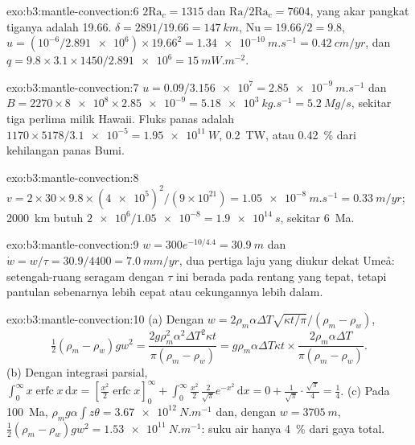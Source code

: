 \begin{solution}{exo:b3:mantle-convection:6}
$2\mathrm{Ra}_c = 1315$ dan $\mathrm{Ra}/2\mathrm{Ra}_c = 7604$, yang akar pangkat tiganya
adalah 19.66. $\delta = 2891/19.66 = \qty{147}{km}$, $\mathrm{Nu} = 19.66/2 =
9.8$, $u = (10^{-6}/\num{2.891e6})\times19.66^2 = \qty{1.34e-10}{m.s^{-1}} =
\qty{0.42}{cm/yr}$, dan $q = 9.8\times3.1\times1450/\num{2.891e6} =
\qty{15}{mW.m^{-2}}$.
\end{solution}

\begin{solution}{exo:b3:mantle-convection:7}
$u = 0.09/\num{3.156e7} = \qty{2.85e-9}{m.s^{-1}}$ dan $B = 2270\times\num{8e8}
\times\num{2.85e-9} = \qty{5.18e3}{kg.s^{-1}} = \qty{5.2}{Mg/s}$, sekitar
tiga perlima milik Hawaii. Fluks panas adalah $1170\times5178/\num{3.1e-5} =
\qty{1.95e11}{W}$, \qty{0.2}{TW}, atau \qty{0.42}{\percent} dari kehilangan
panas Bumi.
\end{solution}

\begin{solution}{exo:b3:mantle-convection:8}
$v = 2\times30\times9.8\times(\num{4e5})^2/(9\times10^{21}) =
\qty{1.05e-8}{m.s^{-1}} = \qty{0.33}{m/yr}$; \qty{2000}{km} butuh
$\num{2e6}/\num{1.05e-8} = \qty{1.9e14}{s}$, sekitar \qty{6}{Ma}.
\end{solution}

\begin{solution}{exo:b3:mantle-convection:9}
$w = 300e^{-10/4.4} = \qty{30.9}{m}$ dan $\dot w = w/\tau = 30.9/4400 =
\qty{7.0}{mm/yr}$, dua pertiga laju yang diukur dekat Umeå: setengah-ruang seragam
dengan $\tau$ ini berada pada rentang yang tepat, tetapi pantulan sebenarnya
lebih cepat atau cekungannya lebih dalam.
\end{solution}

\begin{solution}{exo:b3:mantle-convection:10}
(a) Dengan $w = 2\rho_m\alpha\Delta T\sqrt{\kappa t/\pi}/(\rho_m - \rho_w)$,
\[
  \tfrac12(\rho_m - \rho_w)gw^2 = \frac{2g\rho_m^2\alpha^2\Delta T^2\kappa t}
  {\pi(\rho_m - \rho_w)} = g\rho_m\alpha\Delta T\kappa t\times
  \frac{2\rho_m\alpha\Delta T}{\pi(\rho_m - \rho_w)} .
\] (b) Dengan integrasi parsial,
$\int_0^\infty x\operatorname{erfc}x\,\mathrm dx = [\tfrac{x^2}2\operatorname{erfc}
x]_0^\infty + \int_0^\infty\tfrac{x^2}2\,\tfrac2{\sqrt\pi}e^{-x^2}\,\mathrm dx =
0 + \tfrac1{\sqrt\pi}\cdot\tfrac{\sqrt\pi}4 = \tfrac14$. (c) Pada \qty{100}{Ma},
$\rho_mg\alpha\int z\theta = \qty{3.67e12}{N.m^{-1}}$ dan, dengan $w =
\qty{3705}{m}$, $\tfrac12(\rho_m - \rho_w)gw^2 = \qty{1.53e11}{N.m^{-1}}$: suku
air hanya \qty{4}{\percent} dari gaya total.
\end{solution}

